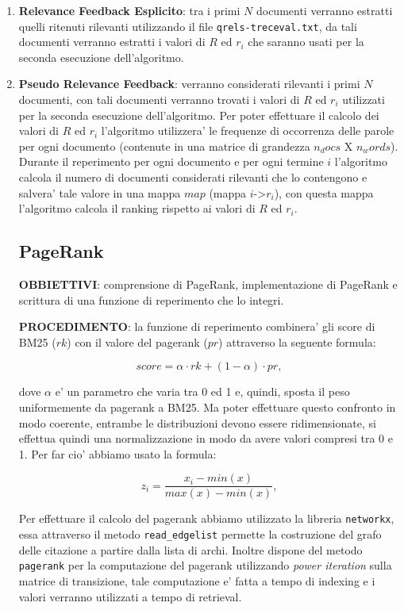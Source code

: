 \begin{enumerate}
\item \textbf{Relevance Feedback Esplicito}: tra i primi $N$ documenti verranno estratti quelli ritenuti rilevanti utilizzando il file \texttt{qrels-treceval.txt}, da tali documenti verranno estratti i valori di $R$ ed $r_i$ che saranno usati per la seconda esecuzione dell'algoritmo.
\item \textbf{Pseudo Relevance Feedback}: verranno considerati rilevanti i primi $N$ documenti, con tali documenti verranno trovati i valori di $R$ ed $r_i$ utilizzati per la seconda esecuzione dell'algoritmo.
Per poter effettuare il calcolo dei valori di $R$ ed $r_i$ l'algoritmo utilizzera' le frequenze di occorrenza delle parole per ogni documento (contenute in una matrice di grandezza $n_docs$ X $n_words$). Durante il reperimento per ogni documento e per ogni termine $i$ l'algoritmo calcola il numero di documenti considerati rilevanti che lo contengono e salvera' tale valore in una mappa $map$ (mappa $i$->$r_i$), con questa mappa l'algoritmo calcola il ranking rispetto ai valori di $R$ ed $r_i$.


\subsection{PageRank}
\label{sec:pagerank}

\textbf{OBBIETTIVI}: comprensione di PageRank, implementazione di PageRank e scrittura di una funzione di reperimento che lo integri.

\textbf{PROCEDIMENTO}: la funzione di reperimento combinera' gli score di BM25 ($rk$) con il valore del pagerank ($pr$) attraverso la seguente formula:

\[ score =  \alpha \cdot rk + (1-\alpha) \cdot pr,\]

dove $\alpha$ e' un parametro che varia tra 0 ed 1 e, quindi, sposta il peso uniformemente da pagerank a BM25.
Ma poter effettuare questo confronto in modo coerente, entrambe le distribuzioni devono essere ridimensionate, si effettua quindi una normalizzazione in modo da avere valori compresi tra 0 e 1. Per far cio' abbiamo usato la formula:

\[ z_i = \frac{x_i - min(x)}{max(x) - min(x)}, \]

Per effettuare il calcolo del pagerank abbiamo utilizzato la libreria \texttt{networkx}, essa attraverso il metodo \texttt{read_edgelist} permette la costruzione del grafo delle citazione a partire dalla lista 	di archi. Inoltre dispone del metodo \texttt{pagerank} per la computazione del pagerank utilizzando \textit{power iteration} sulla matrice di transizione, tale computazione e' fatta a tempo di indexing e i valori verranno utilizzati a tempo di retrieval.

\end{enumerate}
